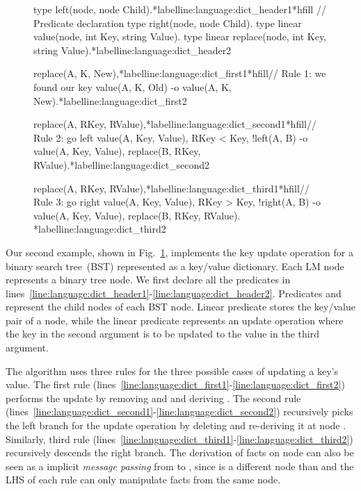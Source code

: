 
\begin{figure}[ht]
\begin{LineCode}[commandchars=\*\{\}]
type left(node, node Child).*label{line:language:dict_header1}*hfill // Predicate declaration
type right(node, node Child).
type linear value(node, int Key, string Value).
type linear replace(node, int Key, string Value).*label{line:language:dict_header2}

replace(A, K, New),*label{line:language:dict_first1}*hfill// Rule 1: we found our key
value(A, K, Old)
   -o value(A, K, New).*label{line:language:dict_first2}

replace(A, RKey, RValue),*label{line:language:dict_second1}*hfill// Rule 2: go left
value(A, Key, Value),
RKey < Key,
!left(A, B)
   -o value(A, Key, Value),
      replace(B, RKey, RValue).*label{line:language:dict_second2}

replace(A, RKey, RValue),*label{line:language:dict_third1}*hfill// Rule 3: go right
value(A, Key, Value),
RKey > Key,
!right(A, B)
   -o value(A, Key, Value),
      replace(B, RKey, RValue). *label{line:language:dict_third2}
\end{LineCode}
\label{code:language:btree_replace}
\end{figure}

Our second example, shown in Fig.~\ref{code:language:btree_replace}, implements
the key update operation for a binary search tree~(BST) represented as a
key/value dictionary. Each LM node represents a binary tree node. We first
declare all the predicates in
lines~\ref{line:language:dict_header1}-\ref{line:language:dict_header2}.
Predicates  and  represent the child nodes of each BST
node. Linear predicate  stores the key/value pair of a node, while
the linear predicate  represents an update operation where the key
in the second argument is to be updated to the value in the third argument.

The algorithm uses three rules for the three possible cases of updating a key's
value. The first rule
(lines~\ref{line:language:dict_first1}-\ref{line:language:dict_first2}) performs
the update by removing  and  and
deriving . The second rule
(lines~\ref{line:language:dict_second1}-\ref{line:language:dict_second2})
recursively picks the left branch for the update operation by deleting
 and re-deriving it at node . Similarly,
third rule
(lines~\ref{line:language:dict_third1}-\ref{line:language:dict_third2})
recursively descends the right branch. The derivation of  facts on
node  can also be seen as a implicit \emph{message passing} from
 to , since  is a different node than  and the
LHS of each rule can only manipulate facts from the same node.

